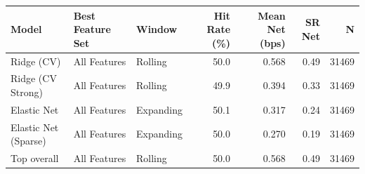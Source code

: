\begin{tabular}{lllrrrr}
\toprule
Model & Best Feature Set & Window & Hit Rate (\%) & Mean Net (bps) & SR Net & N \\
\midrule
Ridge (CV) & All Features & Rolling & 50.0 & 0.568 & 0.49 & 31469 \\
Ridge (CV Strong) & All Features & Rolling & 49.9 & 0.394 & 0.33 & 31469 \\
Elastic Net & All Features & Expanding & 50.1 & 0.317 & 0.24 & 31469 \\
Elastic Net (Sparse) & All Features & Expanding & 50.0 & 0.270 & 0.19 & 31469 \\
\midrule
Top overall & All Features & Rolling & 50.0 & 0.568 & 0.49 & 31469 \\
\bottomrule
\end{tabular}
